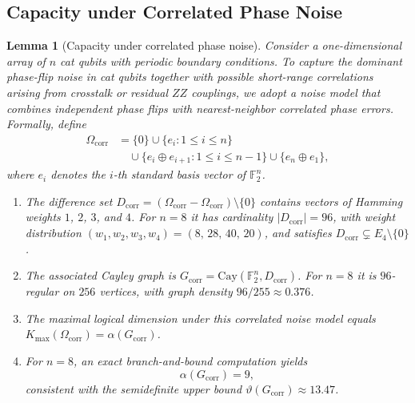 \documentclass[a4paper,twocolumn,11pt,allowtoday]{quantumarticle}
\theoremstyle{plain}
\newtheorem{lemma}[theorem]{Lemma}
\theoremstyle{definition}
\theoremstyle{remark}
\begin{document}
\subsection{Capacity under Correlated Phase Noise}
\label{subsec:catqubit_correlated}

\begin{lemma}[Capacity under correlated phase noise]
\label{lem:catq_correlated}
Consider a one-dimensional array of $n$ cat qubits with periodic
boundary conditions. To capture the dominant phase-flip noise in cat
qubits together with possible short-range correlations arising from
crosstalk or residual $ZZ$ couplings, we adopt a noise model that
combines independent phase flips with nearest-neighbor correlated
phase errors. Formally, define
\[
\begin{aligned}
\Omega_{\mathrm{corr}}
  &= \{0\}
     \cup \{e_i : 1 \le i \le n\} \\
  &\quad \cup \{e_i \oplus e_{i+1} : 1 \le i \le n-1\}
     \cup \{e_n \oplus e_1\},
\end{aligned}
\]
where $e_i$ denotes the $i$-th standard basis vector of
$\mathbb{F}_2^n$.
\begin{enumerate}
\item[\textup{(i)}]
  The difference set
  $D_{\mathrm{corr}}
    = (\Omega_{\mathrm{corr}} - \Omega_{\mathrm{corr}})\setminus\{0\}$
  contains vectors of Hamming weights $1$, $2$, $3$, and $4$.
  For $n = 8$ it has cardinality $|D_{\mathrm{corr}}| = 96$,
  with weight distribution
  $(w_1, w_2, w_3, w_4) = (8,\,28,\,40,\,20)$,
  and satisfies $D_{\mathrm{corr}} \subsetneq E_4 \setminus \{0\}$.
\item[\textup{(ii)}]
  The associated Cayley graph is
  $G_{\mathrm{corr}} = \mathrm{Cay}(\mathbb{F}_2^n, D_{\mathrm{corr}})$.
  For $n = 8$ it is $96$-regular on $256$ vertices,
  with graph density $96/255 \approx 0.376$.
\item[\textup{(iii)}]
  The maximal logical dimension under this correlated noise model
  equals
  $K_{\max}(\Omega_{\mathrm{corr}}) = \alpha(G_{\mathrm{corr}})$.
\item[\textup{(iv)}]
  For $n = 8$, an exact branch-and-bound computation yields
  \[
    \alpha(G_{\mathrm{corr}}) = 9,
  \]
  consistent with the semidefinite upper bound
  $\vartheta(G_{\mathrm{corr}}) \approx 13.47$.
\end{enumerate}
\end{lemma}
\end{document}
